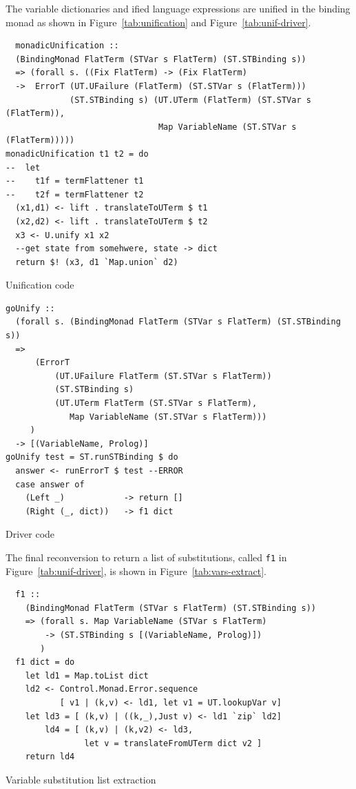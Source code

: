 \documentclass[thesis-solanki.tex]{subfiles}
\begin{document}
\clearpage
The variable dictionaries and ified language expressions are unified in the binding monad as shown
in Figure~\ref{tab:unification} and Figure~\ref{tab:unif-driver}.
%
\begin{code-list}
\begin{verbatim}
  monadicUnification ::
  (BindingMonad FlatTerm (STVar s FlatTerm) (ST.STBinding s))
  => (forall s. ((Fix FlatTerm) -> (Fix FlatTerm)
  ->  ErrorT (UT.UFailure (FlatTerm) (ST.STVar s (FlatTerm)))
             (ST.STBinding s) (UT.UTerm (FlatTerm) (ST.STVar s (FlatTerm)),
                               Map VariableName (ST.STVar s (FlatTerm)))))
monadicUnification t1 t2 = do
--  let
--    t1f = termFlattener t1
--    t2f = termFlattener t2
  (x1,d1) <- lift . translateToUTerm $ t1
  (x2,d2) <- lift . translateToUTerm $ t2
  x3 <- U.unify x1 x2
  --get state from somehwere, state -> dict
  return $! (x3, d1 `Map.union` d2)
\end{verbatim}
  \vspace*{-1.0\baselineskip}
  \caption{Unification code}
  \label{tab:unification}

\begin{verbatim}
goUnify ::
  (forall s. (BindingMonad FlatTerm (STVar s FlatTerm) (ST.STBinding s))
  =>
      (ErrorT
          (UT.UFailure FlatTerm (ST.STVar s FlatTerm))
          (ST.STBinding s)
          (UT.UTerm FlatTerm (ST.STVar s FlatTerm),
             Map VariableName (ST.STVar s FlatTerm)))
     )
  -> [(VariableName, Prolog)]
goUnify test = ST.runSTBinding $ do
  answer <- runErrorT $ test --ERROR
  case answer of
    (Left _)            -> return []
    (Right (_, dict))   -> f1 dict
\end{verbatim}
  \vspace*{-1.0\baselineskip}
  \caption{Driver code}
  \label{tab:unif-driver}
\end{code-list}


The final reconversion to return a list of substitutions,
  called \texttt{f1} in Figure~\ref{tab:unif-driver}, is shown in
  Figure~\ref{tab:vars-extract}.
\begin{code-list}
  \begin{verbatim}
  f1 ::
    (BindingMonad FlatTerm (STVar s FlatTerm) (ST.STBinding s))
    => (forall s. Map VariableName (STVar s FlatTerm)
        -> (ST.STBinding s [(VariableName, Prolog)])
       )
  f1 dict = do
    let ld1 = Map.toList dict
    ld2 <- Control.Monad.Error.sequence
           [ v1 | (k,v) <- ld1, let v1 = UT.lookupVar v]
    let ld3 = [ (k,v) | ((k,_),Just v) <- ld1 `zip` ld2]
        ld4 = [ (k,v) | (k,v2) <- ld3,
                let v = translateFromUTerm dict v2 ]
    return ld4
  \end{verbatim}
  \vspace*{-1.0\baselineskip}
  \caption{Variable substitution list extraction}
  \label{tab:vars-extract}
\end{code-list}
\end{document}

